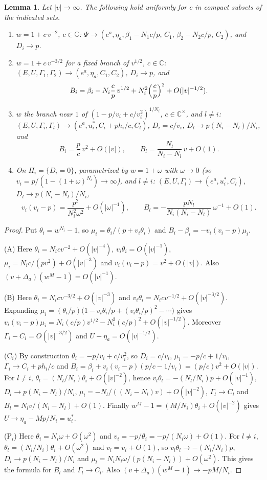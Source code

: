 \documentclass[11pt,a4paper]{article}
\newtheorem{lemma}[theorem]{Lemma}
\theoremstyle{definition}\newtheorem{definition}[theorem]{Definition}
\theoremstyle{remark}\newtheorem{remark}[theorem]{Remark}
\newcommand{\C}{\mathbb C}\newcommand{\Z}{\mathbb Z}
\begin{document}
\begin{lemma}\label{wlbase:tb:regimes}
Let $|v|\to\infty$. The following hold uniformly for $c$ in compact subsets
of the indicated sets.
\begin{enumerate}
\item[(A)] $w=1+c\,v^{-2}$, $c\in\C$:
$\Psi\to(e^a,\eta_a,\beta_1-N_1c/p,\,C_1,\,\beta_2-N_2c/p,\,C_2)$, and
$D_i\to p$.
\item[(B)] $w=1+c\,v^{-3/2}$ for a fixed branch of $v^{1/2}$, $c\in\C$:
$(E,U,\Gamma_1,\Gamma_2)\to(e^a,\eta_a,C_1,C_2)$, $D_i\to p$, and
\[
 B_i=\beta_i-N_i\frac cp\,v^{1/2}+N_i^2\Bigl(\frac cp\Bigr)^2+O(|v|^{-1/2}).
\]
\item[(C$_i$)] $w$ the branch near $1$ of
$(1-p/v_i+c/v_i^2)^{1/N_i}$, $c\in\C^\times$, and $l\ne i$:
$(E,U,\Gamma_i,\Gamma_l)\to(e^a,u_i^*,C_i+ph_i/c,C_l)$,
$D_i=c/v_i$, $D_l\to p(N_i-N_l)/N_i$, and
\[
 B_i=\frac pc\,v^2+O(|v|),\qquad B_l=\frac{N_l}{N_i-N_l}\,v+O(1).
\]
\item[(P$_i$)] On $\Pi_i=\{D_i=0\}$, parametrized by $w=1+\omega$ with
$\omega\to0$ (so $v_i=p/(1-(1+\omega)^{N_i})\to\infty$), and $l\ne i$:
$(E,U,\Gamma_l)\to(e^a,u_i^*,C_l)$, $D_l\to p(N_i-N_l)/N_i$,
\[
 v_i(v_i-p)=\frac{p^2}{N_i^2\omega^2}+O(|\omega|^{-1}),\qquad
 B_l=-\frac{pN_l}{N_i(N_i-N_l)}\,\omega^{-1}+O(1).
\]
\end{enumerate}
\end{lemma}

\begin{proof}
Put $\theta_i=w^{N_i}-1$, so $\mu_i=\theta_i/(p+v_i\theta_i)$ and
$B_i-\beta_i=-v_i(v_i-p)\mu_i$.

(A) Here $\theta_i=N_icv^{-2}+O(|v|^{-4})$, $v_i\theta_i=O(|v|^{-1})$,
$\mu_i=N_ic/(pv^2)+O(|v|^{-3})$ and $v_i(v_i-p)=v^2+O(|v|)$. Also
$(v+\Delta_a)(w^M-1)=O(|v|^{-1})$.

(B) Here $\theta_i=N_icv^{-3/2}+O(|v|^{-3})$ and
$v_i\theta_i=N_icv^{-1/2}+O(|v|^{-3/2})$. Expanding
$\mu_i=(\theta_i/p)\bigl(1-v_i\theta_i/p+(v_i\theta_i/p)^2-\cdots\bigr)$ gives
$v_i(v_i-p)\mu_i=N_i(c/p)v^{1/2}-N_i^2(c/p)^2+O(|v|^{-1/2})$. Moreover
$\Gamma_i-C_i=O(|v|^{-3/2})$ and $U-\eta_a=O(|v|^{-1/2})$.

(C$_i$) By construction $\theta_i=-p/v_i+c/v_i^2$, so $D_i=c/v_i$,
$\mu_i=-p/c+1/v_i$, $\Gamma_i\to C_i+ph_i/c$ and
$B_i=\beta_i+v_i(v_i-p)(p/c-1/v_i)=(p/c)v^2+O(|v|)$. For $l\ne i$,
$\theta_l=(N_l/N_i)\theta_i+O(|v|^{-2})$, hence
$v_l\theta_l=-(N_l/N_i)p+O(|v|^{-1})$, $D_l\to p(N_i-N_l)/N_i$,
$\mu_l=-N_l/((N_i-N_l)v)+O(|v|^{-2})$, $\Gamma_l\to C_l$ and
$B_l=N_lv/(N_i-N_l)+O(1)$. Finally $w^M-1=(M/N_i)\theta_i+O(|v|^{-2})$ gives
$U\to\eta_a-Mp/N_i=u_i^*$.

(P$_i$) Here $\theta_i=N_i\omega+O(\omega^2)$ and
$v_i=-p/\theta_i=-p/(N_i\omega)+O(1)$. For $l\ne i$,
$\theta_l=(N_l/N_i)\theta_i+O(\omega^2)$ and $v_l=v_i+O(1)$, so
$v_l\theta_l\to-(N_l/N_i)p$, $D_l\to p(N_i-N_l)/N_i$ and
$\mu_l=N_iN_l\omega/(p(N_i-N_l))+O(\omega^2)$. This gives the
formula for $B_l$ and $\Gamma_l\to C_l$. Also $(v+\Delta_a)(w^M-1)\to-pM/N_i$.
\end{proof}
\end{document}
